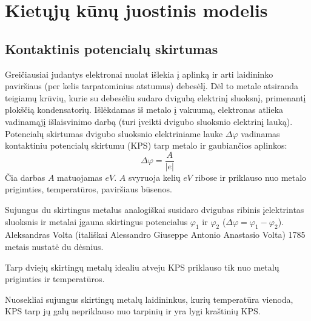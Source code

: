 \section{Kietųjų kūnų juostinis modelis}

\subsection{Kontaktinis potencialų skirtumas}

Greičiausiai judantys elektronai nuolat išlekia į aplinką ir arti
laidininko paviršiaus (per kelis tarpatominius atstumus) debesėlį.
Dėl to metale atsiranda teigiamų krūvių, kurie su debesėliu sudaro
dvigubą elektrinį sluoksnį, primenantį plokščią kondensatorių.
Išlėkdamas iš metalo į vakuumą, elektronas atlieka vadinamąjį
išlaisvinimo darbą (turi įveikti dvigubo sluoksnio elektrinį
lauką). Potencialų skirtumas dvigubo sluoksnio elektriniame lauke
$\Delta \varphi$ vadinamas kontaktiniu potencialų skirtumu (KPS)
tarp metalo ir gaubiančios aplinkos:
\begin{equation*}
  \Delta \varphi = \frac{A}{|e|}
\end{equation*}
Čia darbas $A$ matuojamas $eV$. $A$ svyruoja kelių $eV$ ribose ir
priklauso nuo metalo prigimties, temperatūros, paviršiaus būsenos.


Sujungus du skirtingus metalus analogiškai susidaro dvigubas ribinis
įelektrintas sluoksnis ir metalai įgauna skirtingus potencialus
$\varphi_{1}$ ir $\varphi_{2}$
($\Delta \varphi = \varphi_{1} - \varphi_{2}$). Aleksandras Volta
(itališkai Alessandro Giuseppe Antonio Anastasio Volta) 1785 metais
nustatė du dėsnius.

\begin{defn}
  Tarp dviejų skirtingų metalų idealiu atveju KPS priklauso tik nuo
  metalų prigimties ir temperatūros.
\end{defn}

\begin{defn}
  Nuosekliai sujungus skirtingų metalų laidininkus, kurių temperatūra
  vienoda, KPS tarp jų galų nepriklauso nuo tarpinių ir yra lygi
  kraštinių KPS.
\end{defn}

